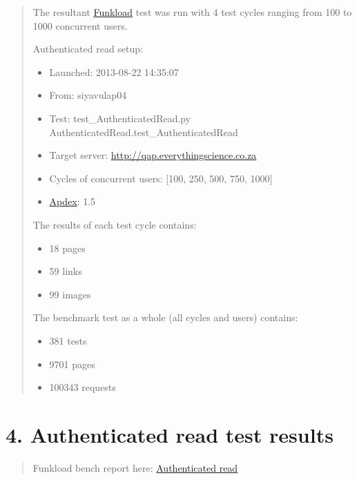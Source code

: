 \documentclass[letterpaper,10pt,english]{sphinxmanual}
\begin{document}
\begin{quote}
The resultant \href{http://funkload.nuxeo.org}{Funkload} test was run with 4 test cycles ranging from 100
to 1000 concurrent users.

Authenticated read setup:
\begin{itemize}
\item {} 
Launched: 2013-08-22 14:35:07

\item {} 
From: siyavulap04

\item {} 
Test: test\_AuthenticatedRead.py AuthenticatedRead.test\_AuthenticatedRead

\item {} 
Target server: \href{http://qap.everythingscience.co.za}{http://qap.everythingscience.co.za}

\item {} 
Cycles of concurrent users: {[}100, 250, 500, 750, 1000{]}

\item {} 
\href{http://apdex.org/}{Apdex}: 1.5

\end{itemize}

The results of each test cycle contains:
\begin{itemize}
\item {} 
18 pages

\item {} 
59 links

\item {} 
99 images

\end{itemize}

The benchmark test as a whole (all cycles and users) contains:
\begin{itemize}
\item {} 
381 tests

\item {} 
9701 pages

\item {} 
100343 requests

\end{itemize}
\end{quote}


\chapter{4. Authenticated read test results}
\label{index:authenticated-read-test-results}\begin{quote}

Funkload bench report here: \href{http://197.221.50.101/stats/test\_AuthenticatedRead-20130822T143507/}{Authenticated read}
\end{quote}
\end{document}
